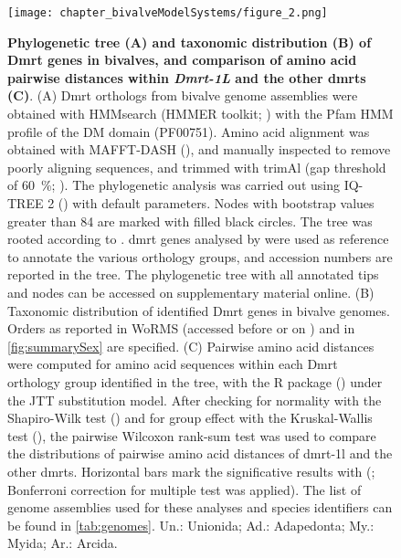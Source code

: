 \begin{figure}
	\centering
	\captionsetup[subfigure]{labelformat=nocaption}
	\begin{subfigure}{0\linewidth}
		\caption{}\label{fig:dmrt-A}
	\end{subfigure}%
	\begin{subfigure}{0\linewidth}
		\caption{}\label{fig:dmrt-B}
	\end{subfigure}%
	\begin{subfigure}{0\linewidth}
		\caption{}\label{fig:dmrt-C}
	\end{subfigure}%
	\texttt{[image: chapter\_bivalveModelSystems/figure\_2.png]}
	\caption[\textbf{Phylogenetic tree (A) and taxonomic distribution (B) of Dmrt genes in bivalves, and comparison of amino acid pairwise distances within \textit{Dmrt-1L} and the other \glspl{dmrt} (B)}]
	{
		\textbf{Phylogenetic tree (A) and taxonomic distribution (B) of Dmrt genes in bivalves, and comparison of amino acid pairwise distances within \textit{Dmrt-1L} and the other \glspl{dmrt} (C)}. (A) Dmrt orthologs from bivalve genome assemblies were obtained with HMMsearch (HMMER toolkit; ) with the Pfam HMM profile of the DM domain (PF00751). Amino acid alignment was obtained with MAFFT-DASH (), and manually inspected to remove poorly aligning sequences, and trimmed with trimAl (gap threshold of \qty{60}{\percent}; ). The phylogenetic analysis was carried out using IQ-TREE 2 () with default parameters. Nodes with bootstrap values greater than 84 are marked with filled black circles. The tree was rooted according to . \gls{dmrt} genes analysed by  were used as reference to annotate the various orthology groups, and accession numbers are reported in the tree. The phylogenetic tree with all annotated tips and nodes can be accessed on supplementary material online. (B) Taxonomic distribution of identified Dmrt genes in bivalve genomes. Orders as reported in WoRMS (accessed before or on ) and in \cref{fig:summarySex} are specified. (C) Pairwise amino acid distances were computed for amino acid sequences within each Dmrt orthology group identified in the tree, with the R package  () under the JTT substitution model. After checking for normality with the Shapiro-Wilk test () and for group effect with the Kruskal-Wallis test (), the pairwise Wilcoxon rank-sum test was used to compare the distributions of pairwise amino acid distances of \gls{dmrt-1l} and the other \glspl{dmrt}. Horizontal bars mark the significative results with  (\singlecurlyquotes{****}; Bonferroni correction for multiple test was applied). The list of genome assemblies used for these analyses and species identifiers can be found in \cref{tab:genomes}. Un.: Unionida; Ad.: Adapedonta; My.: Myida; Ar.: Arcida.
	}


\end{figure}
